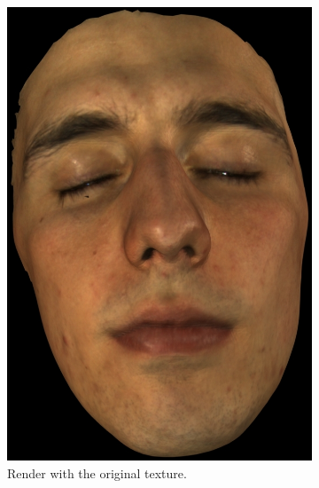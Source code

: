 \begin{figure}
        \centering
        \begin{subfigure}[t]{0.48\textwidth}
                \includegraphics[width=\textwidth]{img/richard_original}
                \caption{Render with the original texture.}
                \label{fig:richard_original}
        \end{subfigure}
        \begin{subfigure}[t]{0.48\textwidth}

\end{subfigure}
\end{figure}
